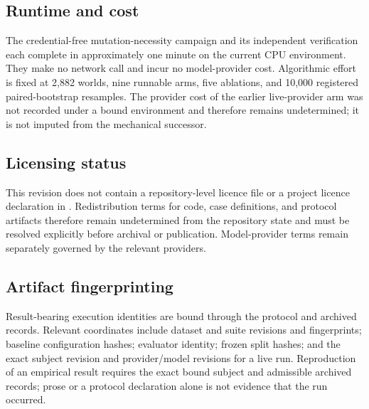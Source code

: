 \subsection{Runtime and cost}
The credential-free mutation-necessity campaign and its independent
verification each complete in approximately one minute on the current CPU
environment. They make no network call and incur no model-provider cost.
Algorithmic effort is fixed at 2,882 worlds, nine runnable arms, five ablations,
and 10,000 registered paired-bootstrap resamples. The provider cost of the
earlier live-provider arm was not recorded under a bound environment and
therefore remains undetermined; it is not imputed from the mechanical
successor.

\subsection{Licensing status}
This revision does not contain a repository-level licence file or a project
licence declaration in . Redistribution terms for code, case
definitions, and protocol artifacts therefore remain undetermined from the
repository state and must be resolved explicitly before archival or
publication. Model-provider terms remain separately governed by the relevant
providers.

\subsection{Artifact fingerprinting}
Result-bearing execution identities are bound through the protocol and archived
records. Relevant coordinates include dataset and suite revisions and
fingerprints; baseline configuration hashes; evaluator identity; frozen split
hashes; and the exact subject revision and provider/model revisions for a live
run. Reproduction of an empirical result requires the exact bound subject and
admissible archived records; prose or a protocol declaration alone is not
evidence that the run occurred.
